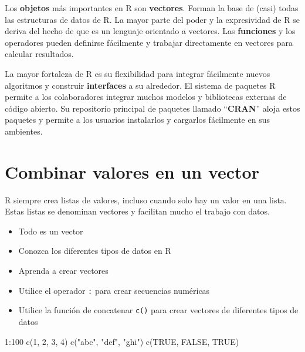 \documentclass[
]{book}
\newenvironment{Shaded}{\begin{snugshade}}{\end{snugshade}}
\newcommand{\ConstantTok}[1]{\textcolor[rgb]{0.00,0.00,0.00}{#1}}
\newcommand{\DecValTok}[1]{\textcolor[rgb]{0.00,0.00,0.81}{#1}}
\newcommand{\FunctionTok}[1]{\textcolor[rgb]{0.00,0.00,0.00}{#1}}
\newcommand{\NormalTok}[1]{#1}
\newcommand{\SpecialCharTok}[1]{\textcolor[rgb]{0.00,0.00,0.00}{#1}}
\newcommand{\StringTok}[1]{\textcolor[rgb]{0.31,0.60,0.02}{#1}}
\providecommand{\tightlist}{%
  \setlength{\itemsep}{0pt}\setlength{\parskip}{0pt}}
\begin{document}
Los \textbf{objetos} más importantes en R son \textbf{vectores}. Forman la base de (casi) todas las estructuras de datos de R. La mayor parte del poder y la expresividad de R se deriva del hecho de que es un lenguaje orientado a vectores. Las \textbf{funciones} y los operadores pueden definirse fácilmente y trabajar directamente en vectores para calcular resultados.

La mayor fortaleza de R es su flexibilidad para integrar fácilmente nuevos algoritmos y construir \textbf{interfaces} a su alrededor. El sistema de paquetes R permite a los colaboradores integrar muchos modelos y bibliotecas externas de código abierto. Su repositorio principal de paquetes llamado ``\textbf{CRAN}'' aloja estos paquetes y permite a los usuarios instalarlos y cargarlos fácilmente en sus ambientes.

\hypertarget{combinar-valores-en-un-vector}{%
\section{Combinar valores en un vector}\label{combinar-valores-en-un-vector}}

R siempre crea listas de valores, incluso cuando solo hay un valor en una lista. Estas listas se denominan vectores y facilitan mucho el trabajo con datos.

\begin{itemize}
\tightlist
\item
  Todo es un vector
\item
  Conozca los diferentes tipos de datos en R
\item
  Aprenda a crear vectores
\item
  Utilice el operador \texttt{:} para crear secuencias numéricas
\item
  Utilice la función de concatenar \texttt{c()} para crear vectores de diferentes tipos de datos
\end{itemize}

\begin{Shaded}
\begin{Highlighting}[]
\DecValTok{1}\SpecialCharTok{:}\DecValTok{100}
\FunctionTok{c}\NormalTok{(}\DecValTok{1}\NormalTok{, }\DecValTok{2}\NormalTok{, }\DecValTok{3}\NormalTok{, }\DecValTok{4}\NormalTok{)}
\FunctionTok{c}\NormalTok{(}\StringTok{"abc"}\NormalTok{, }\StringTok{"def"}\NormalTok{, }\StringTok{"ghi"}\NormalTok{)}
\FunctionTok{c}\NormalTok{(}\ConstantTok{TRUE}\NormalTok{, }\ConstantTok{FALSE}\NormalTok{, }\ConstantTok{TRUE}\NormalTok{)}
\end{Highlighting}
\end{Shaded}
\end{document}
